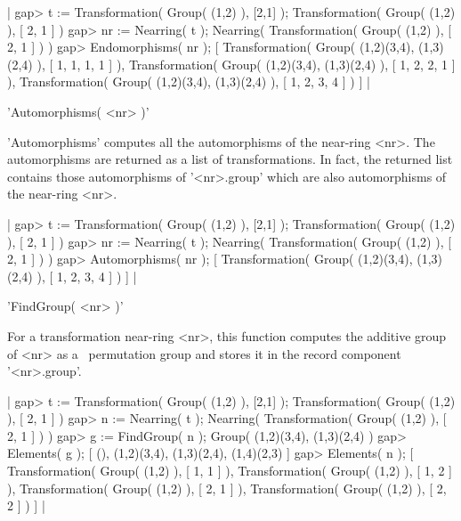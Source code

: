 |  gap> t := Transformation( Group( (1,2) ), [2,1] );
  Transformation( Group( (1,2) ), [ 2, 1 ] )
  gap> nr := Nearring( t );
  Nearring( Transformation( Group( (1,2) ), [ 2, 1 ] ) ) 
  gap> Endomorphisms( nr );
  [ Transformation( Group( (1,2)(3,4), (1,3)(2,4) ), [ 1, 1, 1, 1 ] ), 
    Transformation( Group( (1,2)(3,4), (1,3)(2,4) ), [ 1, 2, 2, 1 ] ), 
    Transformation( Group( (1,2)(3,4), (1,3)(2,4) ), [ 1, 2, 3, 4 ] ) ]
|

   
'Automorphisms( <nr> )'  

'Automorphisms' computes all the automorphisms of the near-ring <nr>. 
The automorphisms are returned as a list of transformations. In fact, the
returned list contains those automorphisms of '<nr>.group' which are 
also automorphisms of the near-ring <nr>.

|  gap> t := Transformation( Group( (1,2) ), [2,1] );
  Transformation( Group( (1,2) ), [ 2, 1 ] )
  gap> nr := Nearring( t );                         
  Nearring( Transformation( Group( (1,2) ), [ 2, 1 ] ) ) 
  gap> Automorphisms( nr );
  [ Transformation( Group( (1,2)(3,4), (1,3)(2,4) ), [ 1, 2, 3, 4 ] ) ]
|

   
'FindGroup( <nr> )'  

For a transformation near-ring <nr>, this function computes the additive
group of <nr> as a  \GAP\ permutation group and stores it in the record
component '<nr>.group'. 

|  gap> t := Transformation( Group( (1,2) ), [2,1] );
  Transformation( Group( (1,2) ), [ 2, 1 ] )
  gap> n := Nearring( t );                          
  Nearring( Transformation( Group( (1,2) ), [ 2, 1 ] ) ) 
  gap> g := FindGroup( n );                         
  Group( (1,2)(3,4), (1,3)(2,4) )
  gap> Elements( g );
  [ (), (1,2)(3,4), (1,3)(2,4), (1,4)(2,3) ]
  gap> Elements( n );
  [ Transformation( Group( (1,2) ), [ 1, 1 ] ), 
    Transformation( Group( (1,2) ), [ 1, 2 ] ), 
    Transformation( Group( (1,2) ), [ 2, 1 ] ), 
    Transformation( Group( (1,2) ), [ 2, 2 ] ) ]
|

   
